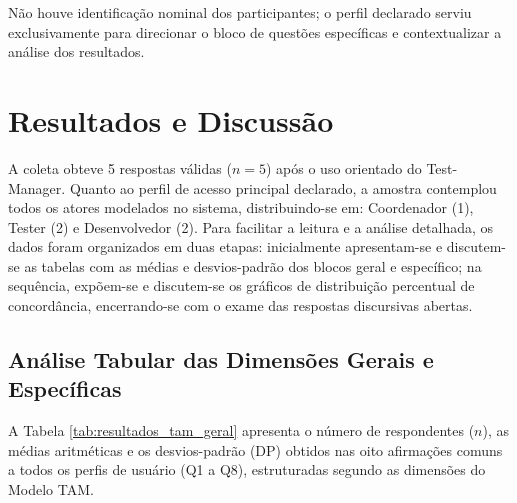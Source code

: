 Não houve identificação nominal dos participantes; o perfil declarado serviu exclusivamente para direcionar o bloco de questões específicas e contextualizar a análise dos resultados.

\section{Resultados e Discussão}

A coleta obteve 5 respostas válidas ($n = 5$) após o uso orientado do Test-Manager. Quanto ao perfil de acesso principal declarado, a amostra contemplou todos os atores modelados no sistema, distribuindo-se em: Coordenador (1), Tester (2) e Desenvolvedor (2). Para facilitar a leitura e a análise detalhada, os dados foram organizados em duas etapas: inicialmente apresentam-se e discutem-se as tabelas com as médias e desvios-padrão dos blocos geral e específico; na sequência, expõem-se e discutem-se os gráficos de distribuição percentual de concordância, encerrando-se com o exame das respostas discursivas abertas.

\subsection{Análise Tabular das Dimensões Gerais e Específicas}

A Tabela \ref{tab:resultados_tam_geral} apresenta o número de respondentes ($n$), as médias aritméticas e os desvios-padrão (DP) obtidos nas oito afirmações comuns a todos os perfis de usuário (Q1 a Q8), estruturadas segundo as dimensões do Modelo TAM.

